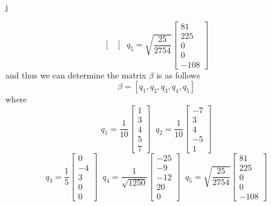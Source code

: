 j\documentclass[12pt]{article}
\begin{document}
\begin{enumerate}
\begin{enumerate}
\[\begin{bmatrix}
        \end{bmatrix}
        \;\;
        q_5=\sqrt{\frac{25}{2754}}
        \begin{bmatrix}
        81\\225\\0\\0\\-108   
        \end{bmatrix}
        \]
        and thus we can determine the matrix $\beta$ is as follows
        \[
        \beta = [q_1,q_2,q_3,q_4,q_5]
        \]
        where
        \[
        q_1=
        \frac{1}{10} 
        \begin{bmatrix}
            1\\3\\4\\5\\7
        \end{bmatrix}\;\;
        q_2=
        \frac{1}{10}
        \begin{bmatrix}
            -7\\3\\4\\-5\\1
        \end{bmatrix}
        \]
        \[
         q_3=
        \frac{1}{5}
        \begin{bmatrix}
            0\\ -4\\ 3 \\0 \\0
        \end{bmatrix}\;\;
        q_4=\frac{1}{\sqrt{1250}}
        \begin{bmatrix}
           -25\\-9\\-12\\20 \\0
        \end{bmatrix}
        \;\;
        q_5=\sqrt{\frac{25}{2754}}
        \begin{bmatrix}
        81\\225\\0\\0\\-108   
        \end{bmatrix}
        \]


\end{enumerate}
\end{enumerate}
\end{document}
